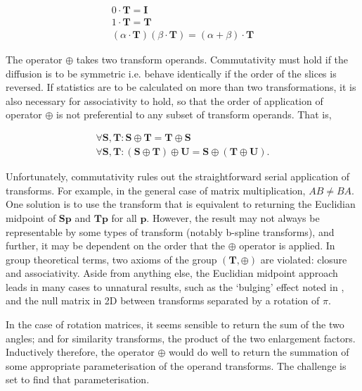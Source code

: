 		\begin{gather}
			0 \cdot \mathbf{T} = \mathbf{I} \label{eqn:null} \\
			1 \cdot \mathbf{T} = \mathbf{T} \label{eqn:identity} \\
			(\alpha \cdot \mathbf{T}) (\beta \cdot \mathbf{T}) = (\alpha + \beta) \cdot \mathbf{T} \label{eqn:distributivity}
		\end{gather}
	 	
	  The operator $\oplus$ takes two transform operands. Commutativity must hold if the diffusion is to be symmetric i.e. behave identically if the order of the slices is reversed. If statistics are to be calculated on more than two transformations, it is also necessary for associativity to hold, so that the order of application of operator $\oplus$ is not preferential to any subset of transform operands. That is,
		
		\begin{gather}
			\forall \mathbf{S}, \mathbf{T} : \mathbf{S} \oplus \mathbf{T} = \mathbf{T} \oplus \mathbf{S} \label{eqn:commutativity} \\
			\forall \mathbf{S}, \mathbf{T} : (\mathbf{S} \oplus \mathbf{T}) \oplus \mathbf{U} = \mathbf{S} \oplus (\mathbf{T} \oplus \mathbf{U}). \label{eqn:associativity}
		\end{gather}
		
		Unfortunately, commutativity rules out the straightforward serial application of transforms. For example, in the general case of matrix multiplication, $AB \ne BA$. One solution is to use the transform that is equivalent to returning the Euclidian midpoint of $\mathbf{Sp}$ and $\mathbf{Tp}$ for all $\mathbf{p}$. However, the result may not always be representable by some types of transform (notably b-spline transforms), and further, it may be dependent on the order that the $\oplus$ operator is applied. In group theoretical terms, two axioms of the group $(\mathbf{T},\oplus)$ are violated: closure and associativity. Aside from anything else, the Euclidian midpoint approach leads in many cases to unnatural results, such as the `bulging' effect noted in \cite{Arsigny2005a}, and the null matrix in 2D between transforms separated by a rotation of $\pi$.
        
        In the case of rotation matrices, it seems sensible to return the sum of the two angles; and for similarity transforms, the product of the two enlargement factors. Inductively therefore, the operator $\oplus$ would do well to return the summation of some appropriate parameterisation of the operand transforms. The challenge is set to find that parameterisation.
		
